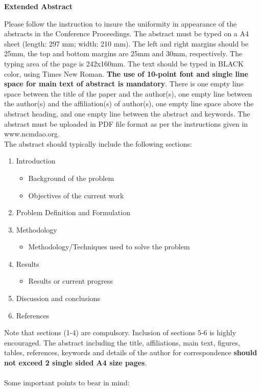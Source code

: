 \documentclass[a4paper,10pt]{article}
\begin{document}
\centerline{\bf Extended Abstract}
\noindent Please follow the instruction to insure the uniformity in appearance of the abstracts in the
Conference Proceedings. The abstract must be typed on a A4 sheet (length: 297 mm; width: 210 mm). The
left and right margins should be 25mm, the top and bottom margins are 25mm and 30mm, respectively. The
typing area of the page is 242x160mm. The text should be typed in BLACK color, using Times New Roman.
{\bf The use of 10-point font and single line space for main text of abstract is mandatory}. There is one
empty line space between the title of the paper and the author(s), one empty line between the 
author(s) and the affiliation(s) of author(s), one empty line space above the abstract heading, 
and one empty line between the abstract and keywords. The abstract must be uploaded in PDF file format 
as per the instructions given in www.ncmdao.org. \\
\noindent The abstract should typically include the following sections:
\begin{enumerate}
	\item Introduction
		\begin{itemize}
			\item Background of the problem
			\item Objectives of the current work
		\end{itemize}
	\item Problem Definition and Formulation
	\item Methodology
		\begin{itemize}
			\item Methodology/Techniques used to solve the problem
		\end{itemize}
	\item Results
		\begin{itemize}
			\item Results or current progress
		\end{itemize}
	\item Discussion and conclusions
	\item References
\end{enumerate}
\noindent Note that sections (1-4) are compulsory.  Inclusion of sections 5-6 is highly encouraged.
The abstract including the title, affiliations, main text, figures, tables, references, keywords and 
details of the author for correspondence {\bf should not exceed 2 single sided A4 size pages}. \\ \\
\noindent Some important points to bear in mind:
\end{document}
